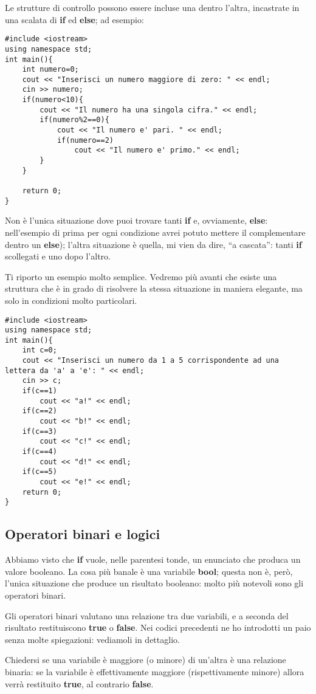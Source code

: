 	Le strutture di controllo possono essere incluse una dentro l'altra, incastrate in una scalata di \textbf{if} ed \textbf{else}; ad esempio:
	\begin{lstlisting}
#include <iostream>
using namespace std;
int main(){
	int numero=0;
	cout << "Inserisci un numero maggiore di zero: " << endl;
	cin >> numero;
	if(numero<10){
		cout << "Il numero ha una singola cifra." << endl;
		if(numero%2==0){
			cout << "Il numero e' pari. " << endl;
			if(numero==2)
				cout << "Il numero e' primo." << endl;
		}
	}
	
	return 0;
}
	\end{lstlisting}
	
	Non è l'unica situazione dove puoi trovare tanti \textbf{if} e, ovviamente, \textbf{else}: nell'esempio di prima per ogni condizione avrei potuto mettere il complementare dentro un \textbf{else}); l'altra situazione è quella, mi vien da dire, ``a cascata'': tanti \textbf{if} scollegati e uno dopo l'altro.
	
	Ti riporto un esempio molto semplice. Vedremo più avanti che esiste una struttura che è in grado di risolvere la stessa situazione in maniera elegante, ma solo in condizioni molto particolari.
	
	\begin{lstlisting}
#include <iostream>
using namespace std;
int main(){
	int c=0;
	cout << "Inserisci un numero da 1 a 5 corrispondente ad una lettera da 'a' a 'e': " << endl;
	cin >> c;
	if(c==1)
		cout << "a!" << endl;
	if(c==2)
		cout << "b!" << endl;
	if(c==3)
		cout << "c!" << endl;
	if(c==4)
		cout << "d!" << endl;
	if(c==5)
		cout << "e!" << endl;
	return 0;
}
	\end{lstlisting}
		
	\subsection{Operatori binari e logici}
	Abbiamo visto che \textbf{if} vuole, nelle parentesi tonde, un enunciato che produca un valore booleano. La cosa più banale è una variabile \textbf{bool}; questa non è, però, l'unica situazione che produce un risultato booleano: molto più notevoli sono gli operatori binari. 
	
	Gli operatori binari valutano una relazione tra due variabili, e a seconda del risultato restituiscono \textbf{true} o \textbf{false}. Nei codici precedenti ne ho introdotti un paio senza molte spiegazioni: vediamoli in dettaglio. 
	
	Chiedersi se una variabile è maggiore (o minore) di un'altra è una relazione binaria: se la variabile è effettivamente maggiore (rispettivamente minore) allora verrà restituito \textbf{true}, al contrario \textbf{false}. 
	
